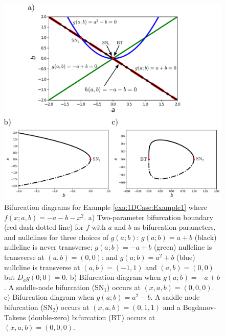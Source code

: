 \documentclass[12pt]{article}
\begin{document}
\begin{figure}
    \begin{center}
        \includegraphics[width=\linewidth]{figures/Example1.pdf}
    \end{center}
    \caption[Bifurcation diagrams for Example \ref{exa:1DCase:Example1}.]{Bifurcation diagrams for Example \ref{exa:1DCase:Example1} where $f(x;a,b)=-a-b-x^2$. a) Two-parameter bifurcation boundary (red dash-dotted line) for $f$ with $a$ and $b$ as bifurcation parameters, and nullclines for three choices of $g(a;b)$: $g(a;b)=a+b$ (black) nullcline is never transverse; $g(a;b)=-a+b$ (green) nullcline is transverse at $(a,b)=(0,0)$; and $g(a;b)=a^{2}+b$ (blue) nullcline is transverse at $(a,b)=(-1,1)$ and $(a,b)=(0,0)$ but $D_{a}g(0;0)=0$. b) Bifurcation diagram when $g(a;b)=-a+b$. A saddle-node bifurcation (SN$_{1}$) occurs at $(x,a,b)=(0,0,0)$. c) Bifurcation diagram when $g(a;b)=a^{2}-b$. A saddle-node bifurcation (SN$_{2}$) occurs at $(x,a,b)=(0,1,1)$ and a Bogdanov-Takens (double-zero) bifurcation (BT) occurs at $(x,a,b)=(0,0,0)$.}
    \label{fig:1DCase:Example1}
\end{figure}
\end{document}
